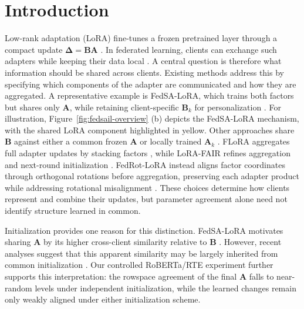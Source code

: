 \documentclass[11pt,letterpaper]{article}
\newcommand{\bA}{\mathbf{A}}
\newcommand{\bB}{\mathbf{B}}
\newcommand{\bDelta}{\boldsymbol{\Delta}}
\begin{document}
\section{Introduction}\label{sec:introduction}
Low-rank adaptation (LoRA) fine-tunes a frozen pretrained layer through a compact update $\bDelta=\bB\bA$ \citep{hu2022lora}.  In federated learning, clients can exchange such adapters while keeping their data local \citep{mcmahan2017communication,zhang2024towards}.
A central question is therefore what information should be shared across clients. Existing methods address this by specifying which components of the adapter are communicated and how they are aggregated.
A representative example is FedSA-LoRA, which trains both factors but shares only $\bA$, while retaining client-specific $\bB_k$ for personalization \citep{guo2024selective}. 
For illustration, Figure~\ref{fig:fedsail-overview} (b) depicts the FedSA-LoRA mechanism, with the shared LoRA component highlighted in yellow.
Other approaches share $\bB$ against either a common frozen $\bA$ \citep{sun2024improving} or locally trained $\bA_k$ \citep{ban2026rethinking}. FLoRA aggregates full adapter updates by stacking factors \citep{wang2024flora}, while LoRA-FAIR refines aggregation and next-round initialization \citep{bian2025lora}.
FedRot-LoRA instead aligns factor coordinates through orthogonal rotations before aggregation, preserving each adapter product while addressing rotational misalignment \citep{zhang2026fedrot}.
These choices determine how clients represent and combine their updates, but parameter agreement alone need not identify structure learned in common.


Initialization provides one reason for this distinction. FedSA-LoRA motivates sharing $\bA$ by its higher cross-client similarity relative to $\bB$ \citep{guo2024selective}. However, recent analyses suggest that this apparent similarity may be largely inherited from common initialization \citep{zhu2024asymmetry,ban2026rethinking}. Our controlled RoBERTa/RTE \citep{liu2019roberta,wang2018glue} experiment further supports this interpretation: the rowspace agreement of the final $\bA$ falls to near-random levels under independent initialization, while the learned changes remain only weakly aligned under either initialization scheme.
\end{document}
